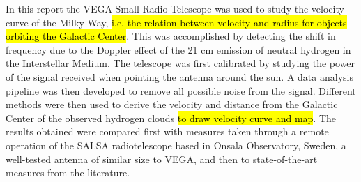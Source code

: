 In this report the VEGA Small Radio Telescope was used to study the velocity curve of the Milky Way, \hl{i.e. the relation between velocity and radius for objects orbiting the Galactic Center}.
This was accomplished by detecting the shift in frequency due to the Doppler effect of the 21 cm emission of neutral hydrogen in the Interstellar Medium.
The telescope was first calibrated by studying the power of the signal received when pointing the antenna around the sun.
A data analysis pipeline was then developed to remove all possible noise from the signal.
Different methods were then used to derive the velocity and distance from the Galactic Center of the observed hydrogen clouds \hl{to draw velocity curve and map}.
The results obtained were compared first with measures taken through a remote operation of the SALSA radiotelescope based in Onsala Observatory, Sweden, a well-tested antenna of similar size to VEGA, and then to state-of-the-art measures from the literature.



